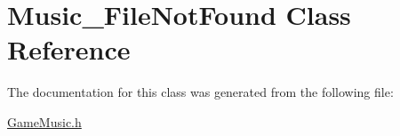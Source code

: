 \hypertarget{class_music___file_not_found}{}\section{Music\+\_\+\+File\+Not\+Found Class Reference}
\label{class_music___file_not_found}


The documentation for this class was generated from the following file\+:\begin{DoxyCompactItemize}
\item 
\hyperlink{_game_music_8h}{Game\+Music.\+h}\end{DoxyCompactItemize}
